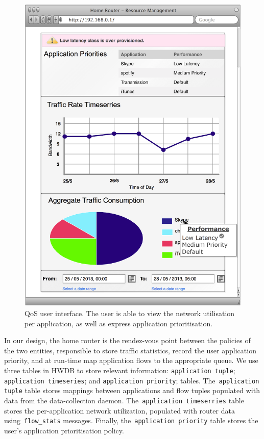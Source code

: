 \begin{figure}
  \centering
  \includegraphics[width=0.8\columnwidth]{homework_intf_qos}
  \caption[QoS user interface]{\label{fig:homework_intf_qos} QoS user interface.
    The user is able to view the network utilisation per application, as well as
    express application prioritisation.}
\end{figure}

In our design, the home router is the rendez-vous point between the policies of
the two entities, responsible to store traffic statistics, record the user
application priority, and at run-time map application flows to the appropriate
queue.  We use three tables in HWDB to store relevant information:
\texttt{application tuple}; \texttt{application timeseries}; and
\texttt{application priority}; tables.  The~\texttt{application tuple} table
stores mappings between applications and flow tuples populated with data from
the data-collection daemon.  The~\texttt{application timeserries} table stores
the per-application network utilization, populated with router data
using~\texttt{flow\_stats} messages.  Finally, the~\texttt{application
priority} table stores the user's application prioritisation policy. 

